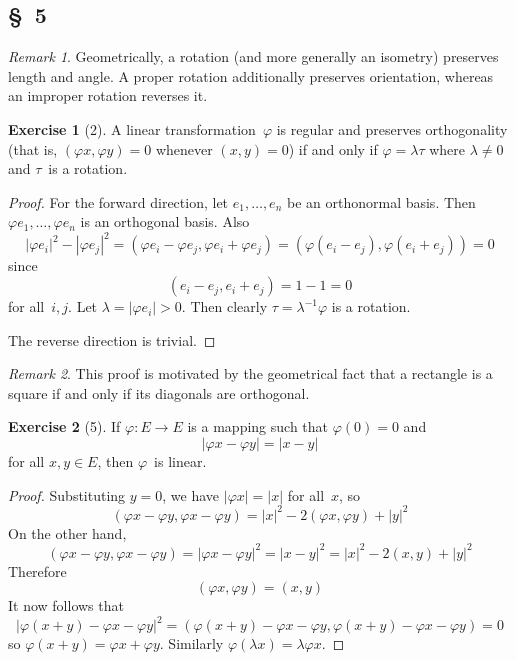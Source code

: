 \documentclass[letterpaper,12pt]{article}
\newcommand{\iprod}[2]{(#1,#2)}
\newcommand{\norm}[1]{|#1|}
\theoremstyle{definition}
\newtheorem*{exer}{Exercise}
\theoremstyle{remark}
\newtheorem*{rmk}{Remark}
\begin{document}
\subsection*{\S~5}
\begin{rmk}
Geometrically, a rotation (and more generally an isometry) preserves length and angle. A proper rotation additionally preserves orientation, whereas an improper rotation reverses it.
\end{rmk}

\begin{exer}[2]
A linear transformation~\(\varphi\) is regular and preserves orthogonality (that is, \(\iprod{\varphi x}{\varphi y}=0\) whenever \(\iprod{x}{y}=0\)) if and only if \(\varphi=\lambda\tau\) where \(\lambda\ne 0\) and \(\tau\)~is a rotation.
\end{exer}
\begin{proof}
For the forward direction, let \(e_1,\ldots,e_n\) be an orthonormal basis. Then \(\varphi e_1,\ldots,\varphi e_n\) is an orthogonal basis. Also
\[\norm{\varphi e_i}^2-\norm{\varphi e_j}^2=\iprod{\varphi e_i-\varphi e_j}{\varphi e_i+\varphi e_j}=\iprod{\varphi(e_i-e_j)}{\varphi(e_i+e_j)}=0\]
since
\[\iprod{e_i-e_j}{e_i+e_j}=1-1=0\]
for all~\(i,j\). Let \(\lambda=\norm{\varphi e_i}>0\). Then clearly \(\tau=\lambda^{-1}\varphi\) is a rotation.

The reverse direction is trivial.
\end{proof}
\begin{rmk}
This proof is motivated by the geometrical fact that a rectangle is a square if and only if its diagonals are orthogonal.
\end{rmk}

\begin{exer}[5]
If \(\varphi:E\to E\) is a mapping such that \(\varphi(0)=0\) and
\[\norm{\varphi x-\varphi y}=\norm{x-y}\]
for all \(x,y\in E\), then \(\varphi\)~is linear.
\end{exer}
\begin{proof}
Substituting \(y=0\), we have \(\norm{\varphi x}=\norm{x}\) for all~\(x\), so
\[\iprod{\varphi x-\varphi y}{\varphi x-\varphi y}=\norm{x}^2-2\iprod{\varphi x}{\varphi y}+\norm{y}^2\]
On the other hand,
\[\iprod{\varphi x-\varphi y}{\varphi x-\varphi y}=\norm{\varphi x-\varphi y}^2=\norm{x-y}^2=\norm{x}^2-2\iprod{x}{y}+\norm{y}^2\]
Therefore
\[\iprod{\varphi x}{\varphi y}=\iprod{x}{y}\]
It now follows that
\[\norm{\varphi(x+y)-\varphi x-\varphi y}^2=\iprod{\varphi(x+y)-\varphi x-\varphi y}{\varphi(x+y)-\varphi x-\varphi y}=0\]
so \(\varphi(x+y)=\varphi x+\varphi y\). Similarly \(\varphi(\lambda x)=\lambda\varphi x\).
\end{proof}
\end{document}
